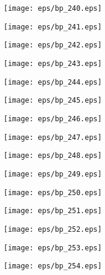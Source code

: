 \documentclass{book}
\begin{document}
	\clearpage\begin{figure}[p]
    \centering
	\texttt{[image: eps/bp\_240.eps]}
	\end{figure}
	\clearpage\begin{figure}[p]
    \centering
	\texttt{[image: eps/bp\_241.eps]}
	\end{figure}
	\clearpage\begin{figure}[p]
    \centering
	\texttt{[image: eps/bp\_242.eps]}
	\end{figure}
	\clearpage\begin{figure}[p]
    \centering
	\texttt{[image: eps/bp\_243.eps]}
	\end{figure}
	\clearpage\begin{figure}[p]
    \centering
	\texttt{[image: eps/bp\_244.eps]}
	\end{figure}
	\clearpage\begin{figure}[p]
    \centering
	\texttt{[image: eps/bp\_245.eps]}
	\end{figure}
	\clearpage\begin{figure}[p]
    \centering
	\texttt{[image: eps/bp\_246.eps]}
	\end{figure}
	\clearpage\begin{figure}[p]
    \centering
	\texttt{[image: eps/bp\_247.eps]}
	\end{figure}
	\clearpage\begin{figure}[p]
    \centering
	\texttt{[image: eps/bp\_248.eps]}
	\end{figure}
	\clearpage\begin{figure}[p]
    \centering
	\texttt{[image: eps/bp\_249.eps]}
	\end{figure}
	\clearpage\begin{figure}[p]
    \centering
	\texttt{[image: eps/bp\_250.eps]}
	\end{figure}
	\clearpage\begin{figure}[p]
    \centering
	\texttt{[image: eps/bp\_251.eps]}
	\end{figure}
	\clearpage\begin{figure}[p]
    \centering
	\texttt{[image: eps/bp\_252.eps]}
	\end{figure}
	\clearpage\begin{figure}[p]
    \centering
	\texttt{[image: eps/bp\_253.eps]}
	\end{figure}
	\clearpage\begin{figure}[p]
    \centering
	\texttt{[image: eps/bp\_254.eps]}
	\end{figure}
\end{document}
